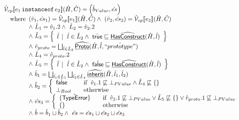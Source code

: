 \documentclass{article}
\newcommand{\SF}[1]{\mbox{\textsf{#1}}}
\newcommand{\TT}[1]{\mbox{\texttt{#1}}}
\newcommand{\wherec}[1]{{\rm where}\begin{array}[t]{l}#1\end{array}}
\newcommand{\ifc}[1]{{\rm if}\begin{array}[t]{l}#1\end{array}}
\newcommand{\owc}{{\rm otherwise}}
\newcommand{\aV}{\hat{\mathcal{V}}}
\newcommand{\set}[1]{\left\{\begin{array}{l}#1\end{array}\right\}}
\newcommand{\lbr}{\llbracket}
\newcommand{\rbr}{\rrbracket}
\newcommand{\ahf}[1]{\widehat{\underline{\sf #1}}}
\newcommand{\exc}[1]{{\sf #1}}
\newcommand{\atrue}{\hat{\SF{true}}}
\newcommand{\afalse}{\hat{\SF{false}}}
\begin{document}
\[
\begin{array}{ll}
\aV_{cp}\lbr e_1\,\TT{instanceof}\,e_2\rbr (\hat{H},\hat{C})
 = \left(\hat{b}_{Value},\hat{es}\right)\\
\quad\wherec{
  (\hat{v}_1,\hat{es}_1) = \aV_{cp}\lbr e_1\rbr(\hat{H},\hat{C})
  \land\ (\hat{v}_2,\hat{es}_2) = \aV_{cp}\lbr e_2\rbr(\hat{H},\hat{C})\\
  \land\ \hat{L}_1 = \hat{v}_1.2
  \land\ \hat{L}_2 = \hat{v}_2.2\\
  \land\ \hat{L}_3 = \set{ \hat{l} \,\mid\ \hat{l}\in\hat{L}_2\land\ \atrue\sqsubseteq\ahf{HasConstruct}(\hat{H},\hat{l}) } \\
  \land\ \hat{v}_{proto} = \bigsqcup_{\hat{l}\in\hat{L}_3} \ahf{Proto}(\hat{H},\hat{l},\hat{``prototype"}) \\
  \land\ \hat{L}_4 = \hat{v}_{proto}.2 \\
  \land\ \hat{L}_5 = \set{ \hat{l} \,\mid\ \hat{l}\in\hat{L}_2\land\ \afalse\sqsubseteq\ahf{HasConstruct}(\hat{H},\hat{l}) } \\
  \land\ \hat{b}_1 = \bigsqcup_{\hat{l_1}\in\hat{L}_1}\bigsqcup_{\hat{l_2}\in\hat{L}_4}\ahf{inherit}(\hat{H},\hat{l}_1,\hat{l}_2) \\
  \land\ \hat{b}_2 = \left\{
    \begin{array}{ll}
      \afalse & \quad\ifc{\hat{v}_1.1\not\sqsubseteq \bot_{PValue} \land \hat{L}_4\not\sqsubseteq \{\}} \\
      \bot_{Bool} & \quad\owc \\
    \end{array}
  \right.\\
  \land\ \hat{es}_3 = \left\{
    \begin{array}{ll}
      \{\hat{\exc{TypeError}}\} & \quad\ifc{\hat{v}_2.1\not\sqsubseteq \bot_{PValue}\lor \hat{L}_5\not\sqsubseteq\{\}\lor\hat{v}_{proto}.1\not\sqsubseteq \bot_{PValue}} \\
      \{\} & \quad\owc \\
    \end{array}
  \right.\\
  \land\ \hat{b} = \hat{b}_1 \sqcup \hat{b}_2 \land\ \hat{es} = \hat{es}_1 \sqcup \hat{es}_2 \sqcup \hat{es}_3
}
\\\\


\end{array}\]
\end{document}
